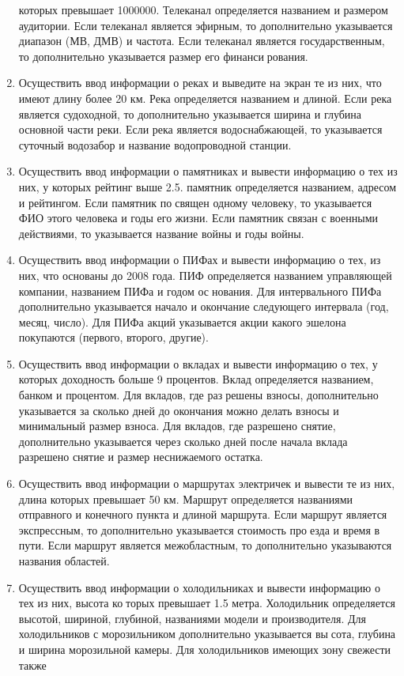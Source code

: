 \begin{enumerate}
которых превышает 1000000. Телеканал определяется названием и размером аудитории. Если
телеканал является эфирным, то дополнительно указывается диапазон (МВ, ДМВ) и частота.
Если телеканал является государственным, то дополнительно указывается размер его финансирования.
\item Осуществить ввод информации о реках и выведите на экран те из них, что имеют длину более
20 км. Река определяется названием и длиной. Если река является судоходной, то дополнительно
указывается ширина и глубина основной части реки. Если река является водоснабжающей, то
указывается суточный водозабор и название водопроводной станции.
\item Осуществить ввод информации о памятниках и вывести информацию о тех из них, у которых
рейтинг выше 2.5. памятник определяется названием, адресом и рейтингом. Если памятник посвящен одному человеку, то указывается ФИО этого человека и годы его жизни. Если памятник
связан с военными действиями, то указывается название войны и годы войны.
\item Осуществить ввод информации о ПИФах и вывести информацию о тех, из них, что основаны до
2008 года. ПИФ определяется названием управляющей компании, названием ПИФа и годом основания. Для интервального ПИФа дополнительно указывается начало и окончание следующего
интервала (год, месяц, число). Для ПИФа акций указывается акции какого эшелона покупаются
(первого, второго, другие).
\item Осуществить ввод информации о вкладах и вывести информацию о тех, у которых доходность
больше 9 процентов. Вклад определяется названием, банком и процентом. Для вкладов, где разрешены взносы, дополнительно указывается за сколько дней до окончания можно делать взносы
и минимальный размер взноса. Для вкладов, где разрешено снятие, дополнительно указывается
через сколько дней после начала вклада разрешено снятие и размер неснижаемого остатка.
\item Осуществить ввод информации о маршрутах электричек и вывести те из них, длина которых
превышает 50 км. Маршрут определяется названиями отправного и конечного пункта и длиной
маршрута. Если маршрут является экспрессным, то дополнительно указывается стоимость проезда и время в пути. Если маршрут является межобластным, то дополнительно указываются
названия областей.
\item Осуществить ввод информации о холодильниках и вывести информацию о тех из них, высота которых превышает 1.5 метра. Холодильник определяется высотой, шириной, глубиной, названиями
модели и производителя. Для холодильников с морозильником дополнительно указывается высота, глубина и ширина морозильной камеры. Для холодильников имеющих зону свежести также

\end{enumerate}
